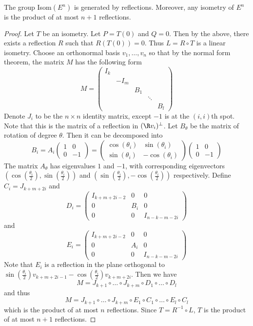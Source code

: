 \begin{thm}{}{} The group Isom$(E^n)$ is generated by reflections. Moreover, any isometry of $E^n$ is the product of at most $n+1$ reflections. \tcbline
\begin{proof} Let $T$ be an isometry. Let $P=T(0)$ and $Q=0$. Then by the above, there exists a reflection $R$ such that $R(T(0))=0$. Thus $L=R\circ T$ is a linear isometry. Choose an orthonormal basis $v_1,\dots,v_n$ so that by the normal form theorem, the matrix $M$ has the following form $$M=\begin{pmatrix}
I_k &&&&\\
&-I_m&&&\\
&&B_1&&\\
&&&\ddots&\\
&&&&B_l
\end{pmatrix}$$
Denote $J_i$ to be the $n\times n$ identity matrix, except $-1$ is at the $(i,i)$th spot. Note that this is the matrix of a reflection in $(\R v_i)^\perp$. Let $B_\theta$ be the matrix of rotation of degree $\theta$. Then it can be decomposed into $$B_i=A_i\begin{pmatrix}
1 & 0\\
0 & -1
\end{pmatrix}=\begin{pmatrix}
\cos(\theta_i) & \sin(\theta_i)\\
\sin(\theta_i) & -\cos(\theta_i)
\end{pmatrix}\begin{pmatrix}
1 & 0\\
0 & -1
\end{pmatrix}$$
The matrix $A_\theta$ has eigenvalues $1$ and $-1$, with corresponding eigenvectors $\left(\cos\left(\frac{\theta_i}{2}\right),\sin\left(\frac{\theta_i}{2}\right)\right)$ and $\left(\sin\left(\frac{\theta_i}{2}\right),-\cos\left(\frac{\theta_i}{2}\right)\right)$ respectively. \linebreak\linebreak
Define $C_i=J_{k+m+2i}$ and $$D_i=\begin{pmatrix}
I_{k+m+2i-2} & 0 & 0\\
0 & B_i & 0\\
0 & 0 & I_{n-k-m-2i}
\end{pmatrix}$$ and $$E_i=\begin{pmatrix}
I_{k+m+2i-2} & 0 & 0\\
0 & A_i & 0\\
0 & 0 & I_{n-k-m-2i}
\end{pmatrix}$$
Note that $E_i$ is a reflection in the plane orthogonal to $\sin\left(\frac{\theta_i}{2}\right)v_{k+m+2i-1}-\cos\left(\frac{\theta_i}{2}\right)v_{k+m+2i}$. Then we have $$M=J_{k+1}\circ\dots\circ J_{k+m}\circ D_1\circ\dots\circ D_l$$ and thus $$M=J_{k+1}\circ\dots\circ J_{k+m}\circ E_1\circ C_1\circ\dots\circ E_l\circ C_l$$ which is the product of at most $n$ reflections. Since $T=R^{-1}\circ L$, $T$ is the product of at most $n+1$ reflections. 
\end{proof}
\end{thm}

